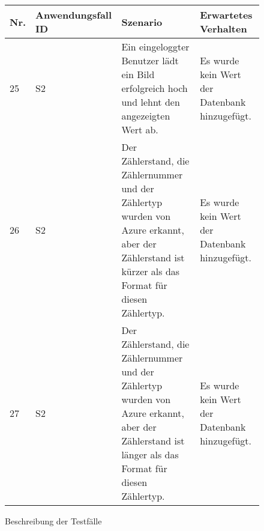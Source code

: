             \begin{figure}[!h]
		\begin{center}
			\begin{tabularx}{\textwidth}{ p{} | p{} | p{} | X }
				\textbf{Nr.} & \textbf{Anwendungsfall ID} & \textbf{Szenario} & \textbf{Erwartetes Verhalten} \\ \hline
                			25 & S2 & Ein eingeloggter Benutzer lädt ein Bild erfolgreich hoch und lehnt den angezeigten Wert ab. & Es wurde kein Wert der Datenbank hinzugefügt. \\ \hline
               	 		26 & S2 & Der Zählerstand, die Zählernummer und der Zählertyp wurden von Azure erkannt, aber der Zählerstand ist kürzer als das Format für diesen Zählertyp.  & Es wurde kein Wert der Datenbank hinzugefügt. \\ \hline
                			27 & S2 & Der Zählerstand, die Zählernummer und der Zählertyp wurden von Azure erkannt, aber der Zählerstand ist länger als das Format für diesen Zählertyp.  & Es wurde kein Wert der Datenbank hinzugefügt. \\ \hline
		\end{tabularx}
	\end{center}	
		
		\caption{Beschreibung der Testfälle}
		\label{fig:testfaelle-tabelle}
	\end{figure}
	